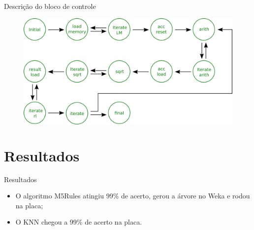 \documentclass[11pt]{beamer}
\begin{document}
\begin{frame}{Descrição do bloco de controle}
	\begin{figure}[ht]
	\centering
	\includegraphics[width=1.0\textwidth]{control_unit}
	\label{fig:control_unit}
	\end{figure}
\end{frame}


\section{Resultados}
\begin{frame}{Resultados}

\begin{itemize}
	\item O algoritmo M5Rules atingiu 99\% de acerto, gerou a árvore no
	Weka e rodou na placa;
	\item O KNN chegou a 99\% de acerto na placa.
\end{itemize}

\end{frame}
\end{document}
